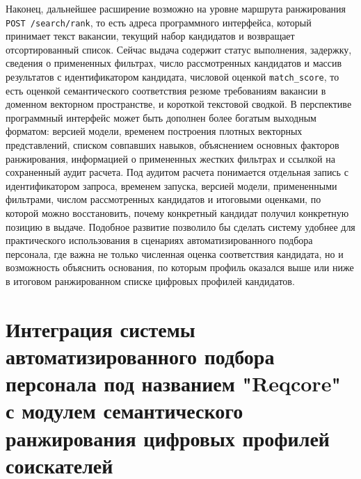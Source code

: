 Наконец, дальнейшее расширение возможно на уровне маршрута ранжирования \texttt{POST {\slash}search{\slash}rank}, то есть адреса программного интерфейса, который принимает текст вакансии, текущий набор кандидатов и возвращает отсортированный список. Сейчас выдача содержит статус выполнения, задержку, сведения о примененных фильтрах, число рассмотренных кандидатов и массив результатов с идентификатором кандидата, числовой оценкой \texttt{match\_score}, то есть оценкой семантического соответствия резюме требованиям вакансии в доменном векторном пространстве, и короткой текстовой сводкой. В перспективе программный интерфейс может быть дополнен более богатым выходным форматом: версией модели, временем построения плотных векторных представлений, списком совпавших навыков, объяснением основных факторов ранжирования, информацией о примененных жестких фильтрах и ссылкой на сохраненный аудит расчета. Под аудитом расчета понимается отдельная запись с идентификатором запроса, временем запуска, версией модели, примененными фильтрами, числом рассмотренных кандидатов и итоговыми оценками, по которой можно восстановить, почему конкретный кандидат получил конкретную позицию в выдаче. Подобное развитие позволило бы сделать систему удобнее для практического использования в сценариях автоматизированного подбора персонала, где важна не только численная оценка соответствия кандидата, но и возможность объяснить основания, по которым профиль оказался выше или ниже в итоговом ранжированном списке цифровых профилей кандидатов.

\section{Интеграция системы автоматизированного подбора персонала под названием "Reqcore" с модулем семантического ранжирования цифровых профилей соискателей}

